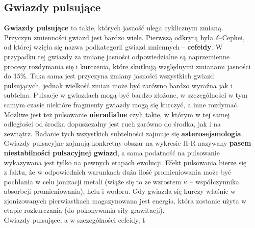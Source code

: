 \documentclass[../index.tex]{subfiles}
\begin{document}
        \subsection{Gwiazdy pulsujące}
            \textbf{Gwiazdy pulsujące} to takie, których jasność ulega cyklicznym zmianą. Przyczyn zmienności gwiazd jest bardzo wiele. Pierwszą odkrytą była \(\delta\)–Cephei, od której wzięła się nazwa podkategorii gwiazd zmiennych – \textbf{cefeidy}. W przypadku tej gwiazdy za zmianę jasności odpowiedzialne są naprzemienne procesy rozdymania się i kurczenia, które skutkują względnymi zmianami jasności do 15\%. Taka sama jest przyczyna zmiany jasności wszystkich gwiazd pulsujących, jednak wielkość zmian może być zarówno bardzo wyraźna jak i subtelna. Pulsacje w gwiazdach mogą być bardzo złożone, w szczególności w tym samym czasie niektóre fragmenty gwiazdy mogą się kurczyć, a inne rozdymać. Możliwe jest też pulsowanie \textbf{nieradialne} czyli takie, w którym w tej samej odległości od środka dopuszczalny jest ruch zarówno do środka, jak i na zewnątrz. Badanie tych wszystkich subtelności zajmuje się \textbf{asterosejsmologia}.\\
            Gwiazdy pulsacyjne zajmują konkretny obszar na wykresie H-R nazywany \textbf{pasem niestabilności pulsacyjnej gwiazd}, a sama podatność na pulsowanie wykazywana jest tylko na pewnych etapach ewolucji. Efekt pulsowania bierze się z faktu, że w odpowiednich warunkach duża ilość promieniowania może być pochłania w celu jonizacji metali (wiąże się to ze wzrostem \(\kappa\) – współczynnika absorbcji promieniowania), helu i wodoru. Gdy gwiazda się kurczy właśnie w zjonizowanych pierwiastkach magazynowana jest energia, która zostanie użyta w etapie rozkurczania (do pokonywania siły grawitacji).\\
            Gwiazdy pulsujące, a w szczególności cefeidy, t
\end{document}
